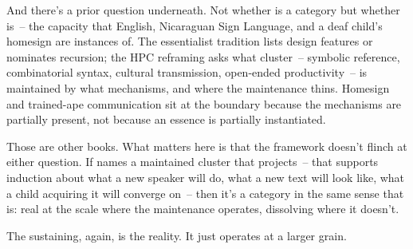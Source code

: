And there's a prior question underneath. Not whether  is a category but whether  is~-- the capacity that English, Nicaraguan Sign Language, and a deaf child's homesign are instances of. The essentialist tradition lists design features or nominates recursion; the HPC reframing asks what cluster~-- symbolic reference, combinatorial syntax, cultural transmission, open-ended productivity~-- is maintained by what mechanisms, and where the maintenance thins. Homesign and trained-ape communication sit at the boundary because the mechanisms are partially present, not because an essence is partially instantiated.

Those are other books. What matters here is that the framework doesn't flinch at either question. If  names a maintained cluster that projects~-- that supports induction about what a new speaker will do, what a new text will look like, what a child acquiring it will converge on~-- then it's a category in the same sense that  is: real at the scale where the maintenance operates, dissolving where it doesn't.

The sustaining, again, is the reality. It just operates at a larger grain.
